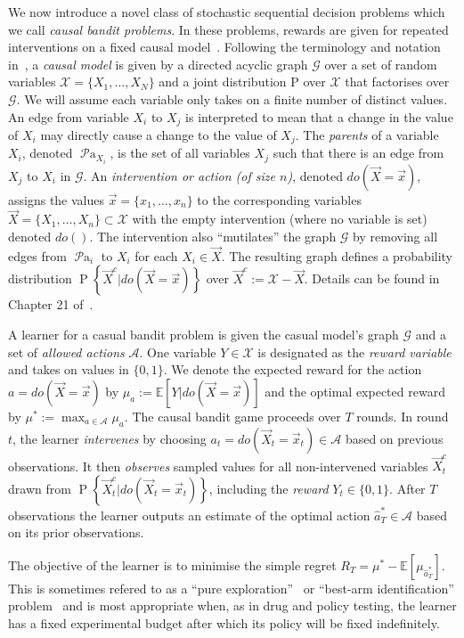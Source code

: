\documentclass{article}
\newcommand{\E}[1]{\mathbb E\left[#1\right]}
\renewcommand{\P}[1]{\operatorname{P}\left\{#1\right\}}
\newcommand{\simpleregret}{R_T}
\newcommand{\parents}[1]{\operatorname{\mathcal{P}a}_{#1}}
\newcommand{\actions}{\mathcal{A}}
\theoremstyle{plain}
\theoremstyle{definition}
\begin{document}
We now introduce a novel class of stochastic sequential decision problems which we call \emph{causal bandit problems}. 
In these problems, rewards are given for repeated interventions on a fixed causal model~\cite{Pearl2000}. 
Following the terminology and notation in~\cite{Koller2009}, a \emph{causal model} is given by a directed acyclic graph $\mathcal{G}$ over a set of random variables $\mathcal{X} = \{ X_1, \ldots, X_N \}$ and a joint distribution $\mathrm{P}$ over $\mathcal{X}$ that factorises over $\mathcal{G}$.
We will assume each variable only takes on a finite number of distinct values.
An edge from variable $X_i$ to $X_j$ is interpreted to mean that a change in the value of $X_i$ may directly cause a change to the value of $X_j$.
The \emph{parents} of a variable $X_i$, denoted $\parents{X_i}$, is the set of all variables $X_j$ such that there is an edge from $X_j$ to $X_i$ in $\mathcal{G}$.
An \emph{intervention or action (of size $n$)}, denoted $do(\vec{X}=\vec{x})$, assigns the values $\vec{x}=\{x_1, \ldots, x_n\}$ to the corresponding variables $\vec{X}=\{X_1, \ldots, X_n\} \subset \mathcal{X}$ with the empty intervention (where no variable is set) denoted $do()$.
The intervention also ``mutilates'' the graph $\mathcal{G}$ by removing all edges from $\parents{i}$ to $X_i$ for each $X_i \in \vec{X}$. 
The resulting graph defines a probability distribution $\P{\vec{X}^c | do(\vec{X}=\vec{x})}$ over $\vec{X}^c := \mathcal{X} - \vec{X}$. 
Details can be found in Chapter 21 of~\cite{Koller2009}.

A learner for a casual bandit problem is given the casual model's graph $\mathcal{G}$ and a set of \emph{allowed actions} $\mathcal{A}$.
One variable $Y \in \mathcal{X}$ is designated as the \emph{reward variable} and takes on values in $\{0, 1\}$.
We denote the expected reward for the action $a = do(\vec{X} = \vec{x})$ by $\mu_{a} := \E{Y | do(\vec{X} = \vec{x})}$ and 
the optimal expected reward by $\mu^* := \max_{a\in\actions} \mu_{a}$. 
The causal bandit game proceeds over $T$ rounds.
In round $t$, the learner \emph{intervenes} by choosing $a_t = do(\vec{X}_t = \vec{x}_t) \in \mathcal{A}$ based on previous observations. 
It then \emph{observes} sampled values for all non-intervened variables $\vec{X}^c_t$ drawn from $\P{\vec{X}^c_t | do(\vec{X}_t = \vec{x}_t)}$, 
including the \emph{reward} $Y_t \in \{0,1\}$. 
After $T$ observations the learner outputs an estimate of the optimal action $\hat a^*_T \in \actions$ based on its prior observations.

The objective of the learner is to minimise the simple regret $\simpleregret = \mu^* - \E{\mu_{\hat a^*_T}}.$ This is sometimes refered to as a ``pure exploration''~\citep{Bubeck2009a} or ``best-arm identification'' problem~\citep{Gabillon2012a} and is most appropriate when, as in drug and policy testing, the learner has a fixed experimental budget after which its policy will be fixed indefinitely. 
\end{document}
